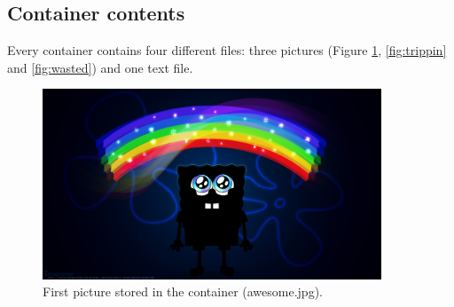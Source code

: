 \documentclass[12pt]{article}
\begin{document}
\subsection{Container contents}

Every container contains four different files: three pictures (Figure \ref{fig:awesome}, \ref{fig:trippin} and \ref{fig:wasted}) and one text file. 

\begin{figure}[H]
    \begin{center}
    \includegraphics[width=0.9\textwidth]{images/awesome.jpg}
    \caption{First picture stored in the container (awesome.jpg).}
    \label{fig:awesome}
    \end{center}
\end{figure}
\end{document}
